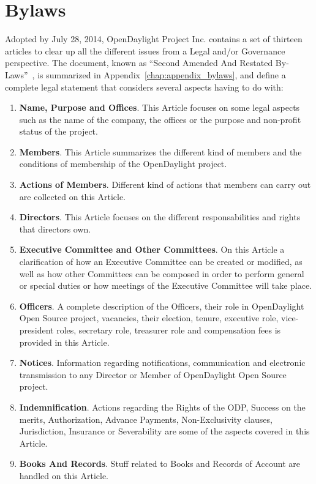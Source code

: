 \documentclass[a4paper, 12pt]{book}
\begin{document}
\section{Bylaws}
\label{sec:bylaws}
Adopted by July 28, 2014, OpenDaylight Project Inc. contains a set of thirteen articles to clear up all the different issues from a Legal and/or Governance perspective. The document, known as ``Second Amended And Restated By-Laws''~\cite{OpenDaylightBylaws}, is summarized in Appendix~\ref{chap:appendix_bylaws}, and define a complete legal statement that considers several aspects having to do with:
\begin{enumerate}\itemsep0pt
 \item{\textbf{Name, Purpose and Offices}}. This Article focuses on some legal aspects such as the name of the company, the offices or the purpose and non-profit status of the project.
 \item{\textbf{Members}}.  This Article summarizes the different kind of members and the conditions of membership of the OpenDaylight project.
 \item{\textbf{Actions of Members}}. Different kind of actions that members can carry out are collected on this Article.
 \item{\textbf{Directors}}. This Article focuses on the different responsabilities and rights that directors own.
 \item{\textbf{Executive Committee and Other Committees}}. On this Article a clarification of how an Executive Committee can be created or modified, as well as how other Committees can be composed in order to perform general or special duties or how meetings of the Executive Committee will take place.
 \item{\textbf{Officers}}. A complete description of the Officers, their role in OpenDaylight Open Source project, vacancies, their election, tenure, executive role, vice-president roles, secretary role, treasurer role and compensation fees is provided in this Article.
 \item{\textbf{Notices}}. Information regarding notifications, communication and electronic transmission to any Director or Member of OpenDaylight Open Source project.
 \item{\textbf{Indemnification}}. Actions regarding the Rights of the ODP, Success on the merits, Authorization, Advance Payments, Non-Exclusivity clauses, Jurisdiction, Insurance or Severability are some of the aspects covered in this Article.
 \item{\textbf{Books And Records}}. Stuff related to Books and Records of Account are handled on this Article.

\end{enumerate}
\end{document}
